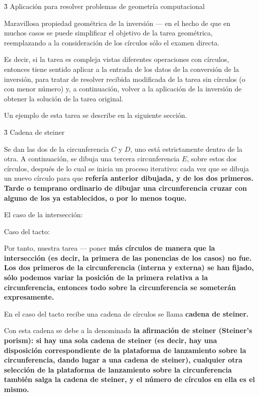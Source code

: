 \h3{ Aplicación para resolver problemas de geometría computacional }

Maravillosa propiedad geométrica de la inversión --- en el hecho de que en muchos casos se puede simplificar el objetivo de la tarea geométrica, reemplazando a la consideración de los círculos sólo el examen directa.

Es decir, si la tarea es compleja vistas diferentes operaciones con círculos, entonces tiene sentido aplicar a la entrada de los datos de la conversión de la inversión, para tratar de resolver recibida modificada de la tarea sin círculos (o con menor número) y, a continuación, volver a la aplicación de la inversión de obtener la solución de la tarea original.

Un ejemplo de esta tarea se describe en la siguiente sección.


\h3{ Cadena de steiner }

Se dan las dos de la circunferencia $C$ y $D$, uno está estrictamente dentro de la otra. A continuación, se dibuja una tercera circunferencia $E$, sobre estos dos círculos, después de lo cual se inicia un proceso iterativo: cada vez que se dibuja un nuevo círculo para que \bf{refería} anterior dibujada, y de los dos primeros. Tarde o temprano ordinario de dibujar una circunferencia cruzar con alguno de los ya establecidos, o por lo menos toque.

El caso de la intersección:


Caso del tacto:


Por tanto, nuestra tarea --- poner \bf{más} círculos de manera que la intersección (es decir, la primera de las ponencias de los casos) no fue. Los dos primeros de la circunferencia (interna y externa) se han fijado, sólo podemos variar la posición de la primera relativa a la circunferencia, entonces todo sobre la circunferencia se someterán expresamente.

En el caso del tacto recibe una cadena de círculos se llama \bf{cadena de steiner}.

Con esta cadena se debe a la denominada \bf{la afirmación de steiner} (Steiner's porism): si hay una sola cadena de steiner (es decir, hay una disposición correspondiente de la plataforma de lanzamiento sobre la circunferencia, dando lugar a una cadena de steiner), cualquier otra selección de la plataforma de lanzamiento sobre la circunferencia también salga la cadena de steiner, y el número de círculos en ella es el mismo.

